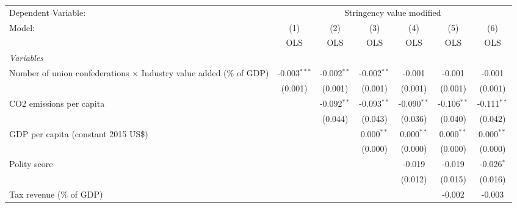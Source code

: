 
\begingroup
\centering
\begin{tabular}{lcccccc}
   \toprule
   Dependent Variable: & \multicolumn{6}{c}{Stringency value modified}\\
   Model:                                                                     & (1)            & (2)           & (3)           & (4)           & (5)           & (6)\\  
                                                                              &  OLS           & OLS           & OLS           & OLS           & OLS           & OLS\\  
   \midrule
   \emph{Variables}\\
   Number of union confederations $\times$ Industry value added (\% of GDP)   & -0.003$^{***}$ & -0.002$^{**}$ & -0.002$^{**}$ & -0.001        & -0.001        & -0.001\\   
                                                                              & (0.001)        & (0.001)       & (0.001)       & (0.001)       & (0.001)       & (0.001)\\   
   CO2 emissions per capita                                                   &                & -0.092$^{**}$ & -0.093$^{**}$ & -0.090$^{**}$ & -0.106$^{**}$ & -0.111$^{**}$\\   
                                                                              &                & (0.044)       & (0.043)       & (0.036)       & (0.040)       & (0.042)\\   
   GDP per capita (constant 2015 US\$)                                        &                &               & 0.000$^{**}$  & 0.000$^{**}$  & 0.000$^{**}$  & 0.000$^{**}$\\   
                                                                              &                &               & (0.000)       & (0.000)       & (0.000)       & (0.000)\\   
   Polity score                                                               &                &               &               & -0.019        & -0.019        & -0.026$^{*}$\\   
                                                                              &                &               &               & (0.012)       & (0.015)       & (0.016)\\   
   Tax revenue (\% of GDP)                                                    &                &               &               &               & -0.002        & -0.003\\   

\end{tabular}
